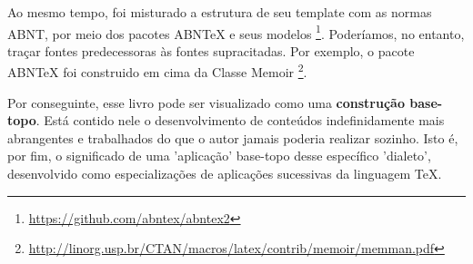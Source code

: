 \documentclass[12pt, brazilian, a5paper]{abntex2} %
\begin{document}




Ao mesmo tempo, foi misturado a estrutura de seu template com as
normas ABNT, por meio dos pacotes ABNTeX e seus modelos
\footnote{\url{https://github.com/abntex/abntex2}}. Poderíamos, no
entanto, traçar fontes predecessoras às fontes supracitadas. Por
exemplo, o pacote ABNTeX foi construido em cima da Classe Memoir
\footnote{\url{http://linorg.usp.br/CTAN/macros/latex/contrib/memoir/memman.pdf}}.

Por conseguinte, esse livro pode ser visualizado como uma
\textbf{construção base-topo}. Está contido nele o desenvolvimento de
conteúdos indefinidamente mais abrangentes e trabalhados do que o
autor jamais poderia realizar sozinho. Isto é, por fim, o significado
de uma 'aplicação' base-topo desse específico 'dialeto', desenvolvido
como especializações de aplicações sucessivas da linguagem \TeX.


\clearpage
\end{document}
